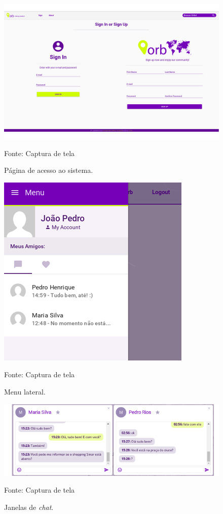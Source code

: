\begin{figure}[H]
	\centering
	\includegraphics[scale=0.35]{imagens/pagina_signin.png}
	\caption{\small Página de acesso ao sistema.} Fonte: Captura de tela
	\label{fig:pagina-signin}
\end{figure}

\begin{figure}[H]
	\centering
	\includegraphics[scale=1]{imagens/aside_menu.png}
	\caption{\small Menu lateral.} Fonte: Captura de tela
	\label{fig:aside-menu}
\end{figure}

\begin{figure}[H]
	\centering
	\includegraphics[scale=1]{imagens/chat_panel.png}
	\caption{\small Janelas de \textit{chat}.} Fonte: Captura de tela
	\label{fig:chat-panel}
\end{figure}


